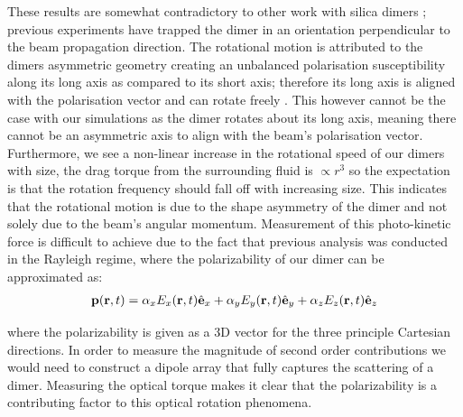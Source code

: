 These results are somewhat contradictory to other work with silica dimers
\cite{Ahn2018, Debuysschere2023,Reimann2018}; previous experiments
have trapped the dimer in an orientation perpendicular to the beam
propagation direction. The rotational motion is attributed to the
dimers asymmetric geometry creating an unbalanced polarisation susceptibility
along its long axis as compared to its short axis; therefore its long
axis is aligned with the polarisation vector and can rotate
freely \cite{Ahn2018}. This however cannot be the case with our
simulations as the dimer rotates about its long axis, meaning there
cannot be an asymmetric axis to align with the beam's polarisation
vector. Furthermore, we see a non-linear increase in the rotational
speed of our dimers with size, the drag torque from the surrounding
fluid is $\propto r^3$ so the expectation is that the rotation
frequency should fall off with increasing size. This indicates that
the rotational motion is due to the shape asymmetry of the dimer and
not solely due to the beam's angular momentum. Measurement of this
photo-kinetic force is difficult to achieve due to the fact that
previous analysis was conducted in the Rayleigh regime, where the
polarizability of our dimer can be approximated as:
\begin{align}
  \bold{p}({\bf r},t)
  =
  \alpha_x E_x({\bf r},t)\hat{\bf e}_x
  + \alpha_yE_y({\bf r},t)\hat{\bf e}_y
  + \alpha_zE_z({\bf r},t)\hat{\bf e}_z
\end{align}

where the polarizability is given as a 3D vector for the three
principle Cartesian directions. In order to measure the magnitude of
second order contributions we would need to construct a dipole array
that fully captures the scattering of a dimer. Measuring the optical torque 
makes it clear that the polarizability is a contributing factor to this optical 
rotation phenomena. 



